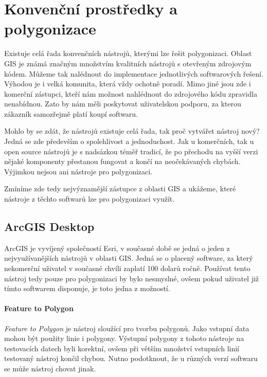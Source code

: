 \chapter{Konvenční prostředky a polygonizace}
\label{chap:konvencni prostredky a polygonizace}
Existuje celá řada konvenčních nástrojů, kterými lze řešit
polygonizaci. Oblast GIS je známá značným množstvím kvalitních
nástrojů s otevřeným zdrojovým kódem. Můžeme tak nalédnout do
implementace jednotlivých softwarových řešení. Výhodou je i velká
komunita, která vždy ochotně poradí. Mimo jiné jsou zde i komerční
zástupci, kteří nám možnost nahlédnout do zdrojového kódu zpravidla
nenabídnou. Zato by nám měli poskytovat uživatelskou podporu, za
kterou zákazník samozřejmě platí koupí softwaru.
	
Mohlo by se zdát, že nástrojů existuje celá řada, tak proč vytvářet
nástroj nový? Jedná se zde především o spolehlivost a
jednoduchost. Jak u komerčních, tak u open source nástrojů je s
nadsázkou téměř tradicí, že po přechodu na vyšší verzi nějaké
komponenty přestanou fungovat a končí na neočekávaných
chybách. Výjimkou nejsou ani nástroje pro polygonizaci.
	
Zmíníme zde tedy nejvýznamější zástupce z oblasti GIS a ukážeme, které
nástroje z těchto softwarů lze pro polygonizaci využít.
	
\section{ArcGIS Desktop}
ArcGIS je vyvíjený společností Esri, v současné době se jedná o jeden
z nejvyužívanějších nástrojů v oblasti GIS. Jedná se o placený
software, za který nekomerční uživatel v současné chvíli zaplatí 100
dolarů ročně. Používat tento nástroj tedy pouze pro polygonizaci by
bylo nesmyslné, ovšem pokud uživatel již tímto softwarem disponuje, je
toto jedna z možností.
	
\subsubsection{Feature to Polygon}
\textit{Feature to Polygon} je nástroj sloužící pro tvorbu
polygonů. Jako vstupní data mohou být použity linie i
polygony. Výstupní polygony z tohoto nástroje na testovacích datech
byli korektní, ovšem při větším množství vstupních linií testovaný
nástroj končil chybou. Nutno podotknout, že u různých verzí softwaru
se může nástroj chovat jinak.


